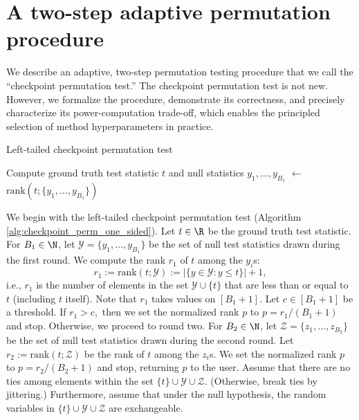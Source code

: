\documentclass[12pt]{article}
\begin{document}
\section{A two-step adaptive permutation procedure}

We describe an adaptive, two-step permutation testing procedure that we call the ``checkpoint permutation test.'' The checkpoint permutation test is not new. However, we formalize the procedure, demonstrate its correctness, and precisely characterize its power-computation trade-off, which enables the principled selection of method hyperparameters in practice.

\begin{algorithm}
	 	
	\caption{Left-tailed checkpoint permutation test}\label{alg:checkpoint_perm_one_sided}
	\BlankLine
	Compute ground truth test statistic $t$ and null statistics $y_1, \dots, y_{B_1}$\;
	\rankone $\leftarrow$ $\textrm{rank}(t; \{y_1, \dots, y_{B_1}\})$\;
\end{algorithm}

We begin with the left-tailed checkpoint permutation test (Algorithm \ref{alg:checkpoint_perm_one_sided}). Let $t \in \R$ be the ground truth test statistic. For $B_1 \in \N$, let $\mathcal{Y} = \{y_1, \dots, y_{B_1}\}$ be the set of null test statistics drawn during the first round. We compute the rank $r_1$ of $t$ among the $y_i$s:
$$ r_1 := \textrm{rank}(t; \mathcal{Y}) := | \{ y \in \mathcal{Y} : y \leq t \} | + 1,$$
i.e., $r_1$ is the number of elements in the set $\mathcal{Y} \cup \{ t \}$ that are less than or equal to $t$ (including $t$ itself). Note that $r_1$ takes values on $[B_1 + 1]$. Let $c \in [B_1 + 1]$ be a threshold. If $r_1 > c,$ then we set the normalized rank $p$ to $p = r_1/(B_1 + 1)$ and stop. Otherwise, we proceed to round two. For $B_2 \in \N$, let $\mathcal{Z} = \{ z_1, \dots, z_{B_2}\}$ be the set of null test statistics drawn during the second round. Let $r_2 := \textrm{rank}(t; \mathcal{Z})$ be the rank of $t$ among the $z_i$s. We set the normalized rank $p$ to $p = r_2/(B_2 + 1)$ and stop, returning $p$ to the user. Assume that there are no ties among elements within the set $\{ t \} \cup \mathcal{Y} \cup \mathcal{Z}$. (Otherwise, break ties by jittering.) Furthermore, assume that under the null hypothesis, the random variables in $\{ t \} \cup \mathcal{Y} \cup \mathcal{Z}$ are exchangeable.
\end{document}
